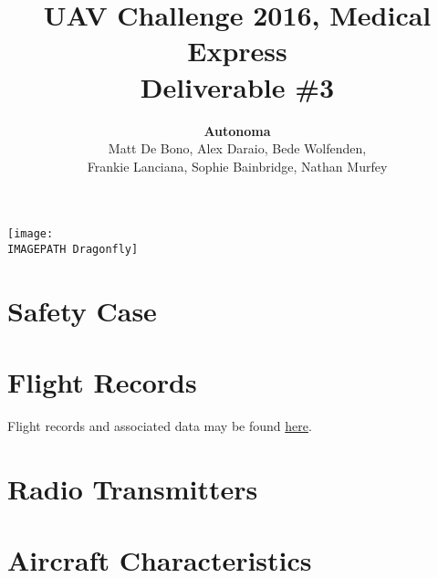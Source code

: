 \documentclass{article}
\title{UAV Challenge 2016, Medical Express\\ Deliverable \#3\\}
\author{
	\textbf{Autonoma}\\
	Matt De Bono,
	Alex Daraio,
	Bede Wolfenden,\\
	Frankie Lanciana,
	Sophie Bainbridge,
	Nathan Murfey}
\newcommand{\IMAGEPATH}{../Images/}
\begin{document}
\maketitle

\vspace{100pt}
\begin{center}
	\texttt{[image: \\IMAGEPATH Dragonfly]}
\end{center}


\clearpage

\tableofcontents

\clearpage

\section{Safety Case}


\section{Flight Records}
Flight records and associated data may be found \href{http://bit.ly/29ykiPs}{here}.

\section{Radio Transmitters}


\section{Aircraft Characteristics}

\end{document}
